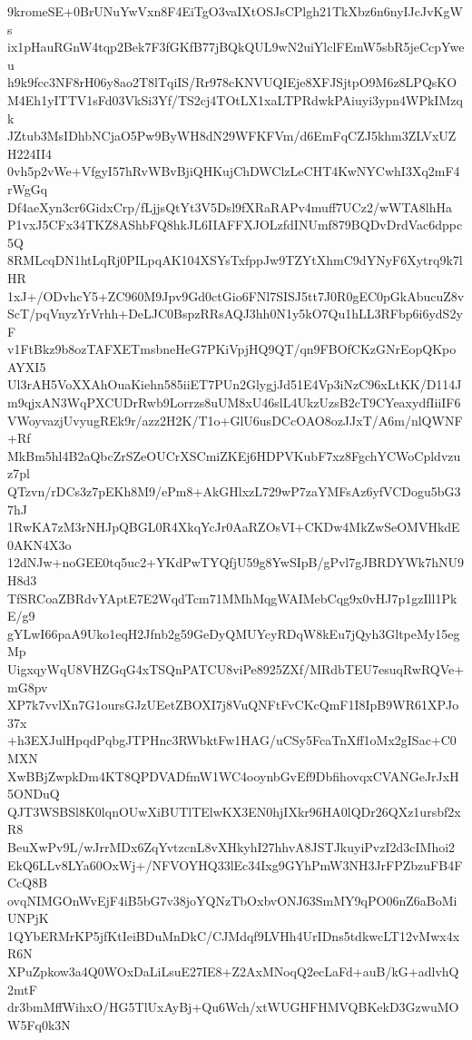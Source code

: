 9kromeSE+0BrUNuYwVxn8F4EiTgO3vaIXtOSJsCPlgh21TkXbz6n6nyIJcJvKgWs
ix1pHauRGnW4tqp2Bek7F3fGKfB77jBQkQUL9wN2uiYlclFEmW5sbR5jeCcpYweu
h9k9fcc3NF8rH06y8ao2T8lTqiIS/Rr978cKNVUQIEje8XFJSjtpO9M6z8LPQsKO
M4Eh1yITTV1sFd03VkSi3Yf/TS2cj4TOtLX1xaLTPRdwkPAiuyi3ypn4WPkIMzqk
JZtub3MsIDhbNCjaO5Pw9ByWH8dN29WFKFVm/d6EmFqCZJ5khm3ZLVxUZH224II4
0vh5p2vWe+VfgyI57hRvWBvBjiQHKujChDWClzLeCHT4KwNYCwhI3Xq2mF4rWgGq
Df4aeXyn3cr6GidxCrp/fLjjsQtYt3V5Dsl9fXRaRAPv4muff7UCz2/wWTA8lhHa
P1vxJ5CFx34TKZ8AShbFQ8hkJL6IIAFFXJOLzfdINUmf879BQDvDrdVac6dppc5Q
8RMLcqDN1htLqRj0PILpqAK104XSYsTxfppJw9TZYtXhmC9dYNyF6Xytrq9k7lHR
1xJ+/ODvhcY5+ZC960M9Jpv9Gd0ctGio6FNl7SISJ5tt7J0R0gEC0pGkAbucuZ8v
ScT/pqVnyzYrVrhh+DeLJC0BspzRRsAQJ3hh0N1y5kO7Qu1hLL3RFbp6i6ydS2yF
v1FtBkz9b8ozTAFXETmsbneHeG7PKiVpjHQ9QT/qn9FBOfCKzGNrEopQKpoAYXI5
Ul3rAH5VoXXAhOuaKiehn585iiET7PUn2GlygjJd51E4Vp3iNzC96xLtKK/D114J
m9qjxAN3WqPXCUDrRwb9Lorrzs8uUM8xU46slL4UkzUzsB2cT9CYeaxydfIiiIF6
VWoyvazjUvyugREk9r/azz2H2K/T1o+GlU6usDCcOAO8ozJJxT/A6m/nlQWNF+Rf
MkBm5hl4B2aQbcZrSZeOUCrXSCmiZKEj6HDPVKubF7xz8FgchYCWoCpldvzuz7pl
QTzvn/rDCs3z7pEKh8M9/ePm8+AkGHlxzL729wP7zaYMFsAz6yfVCDogu5bG37hJ
1RwKA7zM3rNHJpQBGL0R4XkqYcJr0AaRZOsVI+CKDw4MkZwSeOMVHkdE0AKN4X3o
12dNJw+noGEE0tq5uc2+YKdPwTYQfjU59g8YwSIpB/gPvl7gJBRDYWk7hNU9H8d3
TfSRCoaZBRdvYAptE7E2WqdTcm71MMhMqgWAIMebCqg9x0vHJ7p1gzIll1PkE/g9
gYLwI66paA9Uko1eqH2Jfnb2g59GeDyQMUYcyRDqW8kEu7jQyh3GltpeMy15egMp
UigxqyWqU8VHZGqG4xTSQnPATCU8viPe8925ZXf/MRdbTEU7esuqRwRQVe+mG8pv
XP7k7vvlXn7G1oursGJzUEetZBOXI7j8VuQNFtFvCKcQmF1I8IpB9WR61XPJo37x
+h3EXJulHpqdPqbgJTPHnc3RWbktFw1HAG/uCSy5FcaTnXff1oMx2gISac+C0MXN
XwBBjZwpkDm4KT8QPDVADfmW1WC4ooynbGvEf9DbfihovqxCVANGeJrJxH5ONDuQ
QJT3WSBSl8K0lqnOUwXiBUTlTElwKX3EN0hjIXkr96HA0lQDr26QXz1ursbf2xR8
BeuXwPv9L/wJrrMDx6ZqYvtzcnL8vXHkyhI27hhvA8JSTJkuyiPvzI2d3cIMhoi2
EkQ6LLv8LYa60OxWj+/NFVOYHQ33lEc34Ixg9GYhPmW3NH3JrFPZbzuFB4FCcQ8B
ovqNIMGOnWvEjF4iB5bG7v38joYQNzTbOxbvONJ63SmMY9qPO06nZ6aBoMiUNPjK
1QYbERMrKP5jfKtIeiBDuMnDkC/CJMdqf9LVHh4UrIDns5tdkwcLT12vMwx4xR6N
XPuZpkow3a4Q0WOxDaLiLsuE27IE8+Z2AxMNoqQ2ecLaFd+auB/kG+adlvhQ2mtF
dr3bmMffWihxO/HG5TlUxAyBj+Qu6Wch/xtWUGHFHMVQBKekD3GzwuMOW5Fq0k3N
